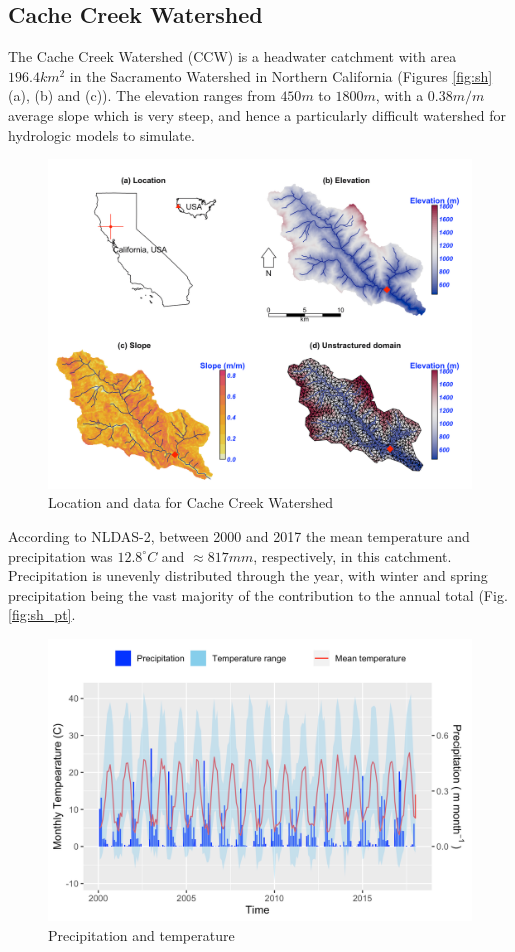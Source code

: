 \documentclass[]{scrbook}
\begin{document}
\subsection{Cache Creek Watershed}\label{cache-creek-watershed}

The Cache Creek Watershed (CCW) is a headwater catchment with area
\(196.4 km^2\) in the Sacramento Watershed in Northern California
(Figures \ref{fig:sh} (a), (b) and (c)). The elevation ranges from
\(450 m\) to \(1800 m\), with a \(0.38 m/m\) average slope which is very
steep, and hence a particularly difficult watershed for hydrologic
models to simulate.

\begin{figure}
\centering
\includegraphics{Fig/Example/CacheCreek/sac5_map.png}
\caption{Location and data for Cache Creek Watershed}
\end{figure}

According to NLDAS-2, between 2000 and 2017 the mean temperature and
precipitation was \(12.8 ^\circ C\) and \(\approx 817 mm\),
respectively, in this catchment. Precipitation is unevenly distributed
through the year, with winter and spring precipitation being the vast
majority of the contribution to the annual total (Fig. \ref{fig:sh_pt}.

\begin{figure}
\centering
\includegraphics{Fig/Example/CacheCreek/sac5_PT.png}
\caption{Precipitation and temperature}
\end{figure}
\end{document}
